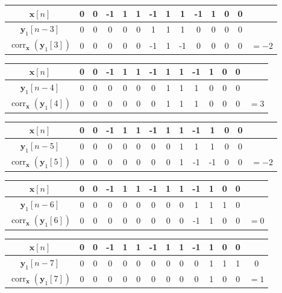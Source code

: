 \documentclass[]{article}
\renewcommand{\vec}[1]{\mathbf{#1}}
\newcommand{\corr}{\operatorname{corr}}
\begin{document}
\begin{flushleft}
\begin{tabular}{c|ccccccccccccc}
\end{tabular} \vspace{5 mm}
\begin{tabular}{c|ccccccccccccc}
	\(\vec{x}[n]\) & 0 & 0 & -1 & 1 & 1 & -1 & 1 & 1 & -1 & 1 & 0 & 0 \\
	\hline
	\(\vec{y}_1[n - 3]\) & 0 & 0 & 0 & 0 & 0 & 1 & 1 & 1 & 0 & 0 & 0 & 0 \\
	\(\corr_{\vec{x}}(\vec{y}_1[3])\) & 0 & 0 & 0 & 0 & 0 & -1 & 1 & -1 & 0 & 0 & 0 & 0 & \(= -2\) \\
\end{tabular} \vspace{5 mm}
\begin{tabular}{c|ccccccccccccc}
	\(\vec{x}[n]\) & 0 & 0 & -1 & 1 & 1 & -1 & 1 & 1 & -1 & 1 & 0 & 0 \\
	\hline
	\(\vec{y}_1[n - 4]\) & 0 & 0 & 0 & 0 & 0 & 0 & 1 & 1 & 1 & 0 & 0 & 0 \\
	\(\corr_{\vec{x}}(\vec{y}_1[4])\) & 0 & 0 & 0 & 0 & 0 & 0 & 1 & 1 & 1 & 0 & 0 & 0 & \(= 3\) \\
\end{tabular} \vspace{5 mm}
\begin{tabular}{c|ccccccccccccc}
	\(\vec{x}[n]\) & 0 & 0 & -1 & 1 & 1 & -1 & 1 & 1 & -1 & 1 & 0 & 0 \\
	\hline
	\(\vec{y}_1[n - 5]\) & 0 & 0 & 0 & 0 & 0 & 0 & 0 & 1 & 1 & 1 & 0 & 0 \\
	\(\corr_{\vec{x}}(\vec{y}_1[5])\) & 0 & 0 & 0 & 0 & 0 & 0 & 0 & 1 & -1 & -1 & 0 & 0 & \(= -2\) \\
\end{tabular} \vspace{5 mm}
\begin{tabular}{c|ccccccccccccc}
	\(\vec{x}[n]\) & 0 & 0 & -1 & 1 & 1 & -1 & 1 & 1 & -1 & 1 & 0 & 0 \\
	\hline
	\(\vec{y}_1[n - 6]\) & 0 & 0 & 0 & 0 & 0 & 0 & 0 & 0 & 1 & 1 & 1 & 0 \\
	\(\corr_{\vec{x}}(\vec{y}_1[6])\) & 0 & 0 & 0 & 0 & 0 & 0 & 0 & 0 & -1 & 1 & 0 & 0 & \(= 0\) \\
\end{tabular} \vspace{5 mm}
\begin{tabular}{c|ccccccccccccc}
	\(\vec{x}[n]\) & 0 & 0 & -1 & 1 & 1 & -1 & 1 & 1 & -1 & 1 & 0 & 0 \\
	\hline
	\(\vec{y}_1[n - 7]\) & 0 & 0 & 0 & 0 & 0 & 0 & 0 & 0 & 0 & 1 & 1 & 1 & 0 \\
	\(\corr_{\vec{x}}(\vec{y}_1[7])\) & 0 & 0 & 0 & 0 & 0 & 0 & 0 & 0 & 0 & 1 & 0 & 0 & \(= 1\) \\
\end{tabular} \vspace{5 mm}
\end{flushleft}
\end{document}
